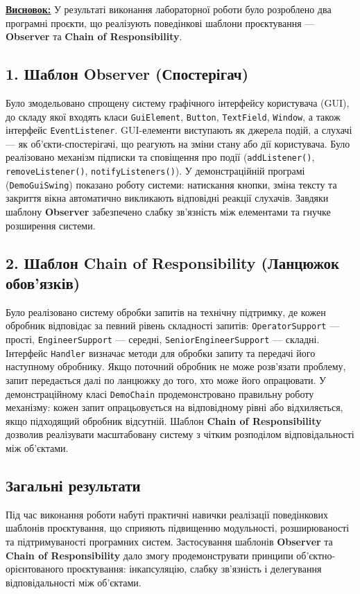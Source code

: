 \documentclass[12pt,a4paper]{article}
\begin{document}
    \newpage

    \textbf{\underline{Висновок:}} 
    У результаті виконання лабораторної роботи було розроблено два програмні проєкти, що реалізують поведінкові шаблони проєктування — \textbf{Observer} та \textbf{Chain of Responsibility}.

    \setlength{\parindent}{1.5em}

    \subsection*{1. Шаблон \textbf{Observer} (Спостерігач)}
    Було змодельовано спрощену систему графічного інтерфейсу користувача (GUI), до складу якої входять класи \texttt{GuiElement}, \texttt{Button}, \texttt{TextField}, \texttt{Window}, а також інтерфейс \texttt{EventListener}.  
    GUI-елементи виступають як джерела подій, а слухачі — як об’єкти-спостерігачі, що реагують на зміни стану або дії користувача.  
    Було реалізовано механізм підписки та сповіщення про події (\texttt{addListener()}, \texttt{removeListener()}, \texttt{notifyListeners()}).  
    У демонстраційній програмі (\texttt{DemoGuiSwing}) показано роботу системи: натискання кнопки, зміна тексту та закриття вікна автоматично викликають відповідні реакції слухачів.  
    Завдяки шаблону \textbf{Observer} забезпечено слабку зв’язність між елементами та гнучке розширення системи.

    \subsection*{2. Шаблон \textbf{Chain of Responsibility} (Ланцюжок обов’язків)}
    Було реалізовано систему обробки запитів на технічну підтримку, де кожен обробник відповідає за певний рівень складності запитів: \texttt{OperatorSupport} — прості, \texttt{EngineerSupport} — середні, \texttt{SeniorEngineerSupport} — складні.  
    Інтерфейс \texttt{Handler} визначає методи для обробки запиту та передачі його наступному обробнику.  
    Якщо поточний обробник не може розв’язати проблему, запит передається далі по ланцюжку до того, хто може його опрацювати.  
    У демонстраційному класі \texttt{DemoChain} продемонстровано правильну роботу механізму: кожен запит опрацьовується на відповідному рівні або відхиляється, якщо підходящий обробник відсутній.  
    Шаблон \textbf{Chain of Responsibility} дозволив реалізувати масштабовану систему з чітким розподілом відповідальності між об’єктами.

    \subsection*{Загальні результати}
    Під час виконання роботи набуті практичні навички реалізації поведінкових шаблонів проєктування, що сприяють підвищенню модульності, розширюваності та підтримуваності програмних систем.  
    Застосування шаблонів \textbf{Observer} та \textbf{Chain of Responsibility} дало змогу продемонструвати принципи об’єктно-орієнтованого проєктування: інкапсуляцію, слабку зв’язність і делегування відповідальності між об’єктами.
 
\end{document}
